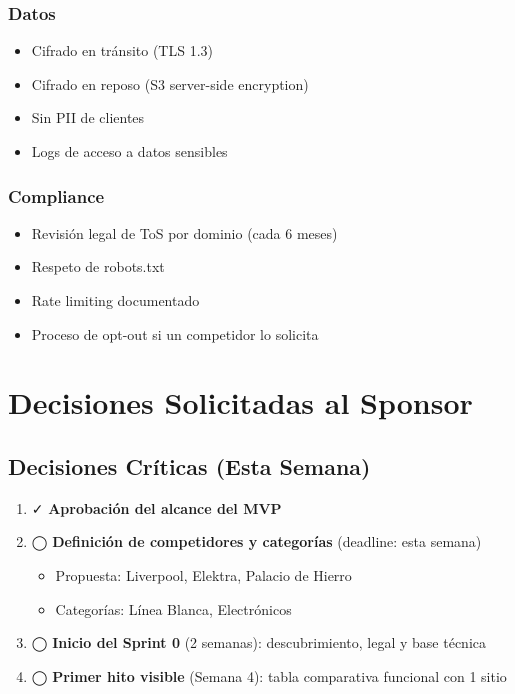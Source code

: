 \documentclass[12pt,a4paper]{article}
\begin{document}
\subsubsection*{Datos}
\begin{itemize}[leftmargin=*]
    \item Cifrado en tránsito (TLS 1.3)
    \item Cifrado en reposo (S3 server-side encryption)
    \item Sin PII de clientes
    \item Logs de acceso a datos sensibles
\end{itemize}

\subsubsection*{Compliance}
\begin{itemize}[leftmargin=*]
    \item Revisión legal de ToS por dominio (cada 6 meses)
    \item Respeto de robots.txt
    \item Rate limiting documentado
    \item Proceso de opt-out si un competidor lo solicita
\end{itemize}

\section{Decisiones Solicitadas al Sponsor}

\subsection{Decisiones Críticas (Esta Semana)}

\begin{enumerate}[leftmargin=*]
    \item \textcolor{successgreen}{✓} \textbf{Aprobación del alcance del MVP}
    \item \textcolor{dangerred}{◯} \textbf{Definición de competidores y categorías} (deadline: esta semana)
    \begin{itemize}
        \item Propuesta: Liverpool, Elektra, Palacio de Hierro
        \item Categorías: Línea Blanca, Electrónicos
    \end{itemize}
    \item \textcolor{warningyellow}{◯} \textbf{Inicio del Sprint 0} (2 semanas): descubrimiento, legal y base técnica
    \item \textcolor{warningyellow}{◯} \textbf{Primer hito visible} (Semana 4): tabla comparativa funcional con 1 sitio
\end{enumerate}
\end{document}
